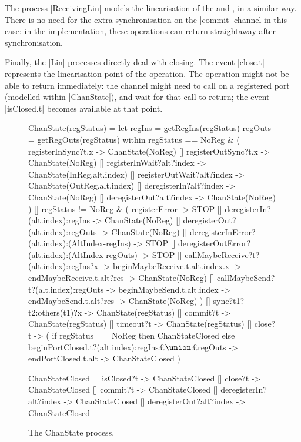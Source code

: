 The process |ReceivingLin| models the linearisation of the  and
, in a similar way.  There is no need for the extra
synchronisation on the |commit| channel in this case: in the implementation,
these operations can return straightaway after synchronisation. 

Finally, the |Lin| processes directly deal with closing.  The event |close.t|
represents the linearisation point of the operation.  The 
operation might not be able to return immediately: the channel might need to
call  on a registered port (modelled within |ChanState|),
and wait for that call to return; the event |isClosed.t| becomes available at
that point.

 
\begin{figure}
\begin{cspm}
ChanState(regStatus) = 
  let regIns = getRegIns(regStatus)
      regOuts = getRegOuts(regStatus)
  within
  regStatus == NoReg & (
    registerInSync?t.x -> ChanState(NoReg) 
    [] registerOutSync?t.x -> ChanState(NoReg)
    [] registerInWait?alt?index -> ChanState(InReg.alt.index)
    [] registerOutWait?alt?index -> ChanState(OutReg.alt.index)
    [] deregisterIn?alt?index ->  ChanState(NoReg)
    [] deregisterOut?alt?index ->  ChanState(NoReg)
  )
  []
  regStatus != NoReg & (
    registerError -> STOP
    [] deregisterIn?(alt.index):regIns ->  ChanState(NoReg)
    [] deregisterOut?(alt.index):regOuts -> ChanState(NoReg)
    [] deregisterInError?(alt.index):(AltIndex-regIns) -> STOP
    [] deregisterOutError?(alt.index):(AltIndex-regOuts) -> STOP
    [] callMaybeReceive?t?(alt.index):regIns?x -> beginMaybeReceive.t.alt.index.x -> 
         endMaybeReceive.t.alt?res -> ChanState(NoReg)
    [] callMaybeSend?t?(alt.index):regOuts -> beginMaybeSend.t.alt.index -> 
         endMaybeSend.t.alt?res -> ChanState(NoReg)
  )
  [] 
  sync?t1?t2:others(t1)?x -> ChanState(regStatus)
  []
  commit?t -> ChanState(regStatus)
  []
  timeout?t -> ChanState(regStatus)
  []
  close?t -> (
    if regStatus == NoReg then ChanStateClosed
    else beginPortClosed.t?(alt.index):regIns£$\union$£regOuts -> endPortClosed.t.alt -> ChanStateClosed
  )

ChanStateClosed = 
  isClosed?t -> ChanStateClosed
  [] close?t -> ChanStateClosed
  [] commit?t -> ChanStateClosed
  [] deregisterIn?alt?index -> ChanStateClosed
  [] deregisterOut?alt?index -> ChanStateClosed
\end{cspm}
\caption{The {\scalashape ChanState} process.  \label{fig:ChanState}}
\end{figure}

